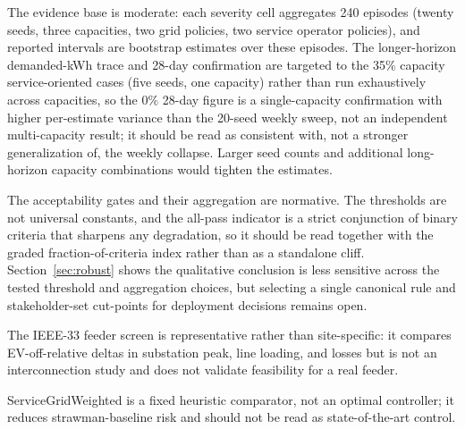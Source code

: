 \documentclass[12pt]{article}
\begin{document}
The evidence base is moderate: each severity cell aggregates 240 episodes (twenty seeds, three capacities, two grid policies, two service operator policies), and reported intervals are bootstrap estimates over these episodes. The longer-horizon demanded-kWh trace and 28-day confirmation are targeted to the 35\% capacity service-oriented cases (five seeds, one capacity) rather than run exhaustively across capacities, so the $0\%$ 28-day figure is a single-capacity confirmation with higher per-estimate variance than the 20-seed weekly sweep, not an independent multi-capacity result; it should be read as consistent with, not a stronger generalization of, the weekly collapse. Larger seed counts and additional long-horizon capacity combinations would tighten the estimates.

The acceptability gates and their aggregation are normative. The thresholds are not universal constants, and the all-pass indicator is a strict conjunction of binary criteria that sharpens any degradation, so it should be read together with the graded fraction-of-criteria index rather than as a standalone cliff. Section~\ref{sec:robust} shows the qualitative conclusion is less sensitive across the tested threshold and aggregation choices, but selecting a single canonical rule and stakeholder-set cut-points for deployment decisions remains open.

The IEEE-33 feeder screen is representative rather than site-specific: it compares EV-off-relative deltas in substation peak, line loading, and losses but is not an interconnection study and does not validate feasibility for a real feeder.

ServiceGridWeighted is a fixed heuristic comparator, not an optimal controller; it reduces strawman-baseline risk and should not be read as state-of-the-art control.
\end{document}
